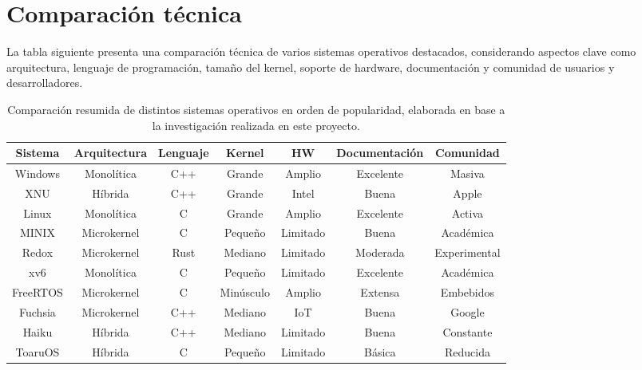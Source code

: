 \chapter{Comparación técnica}

La tabla siguiente presenta una comparación técnica de varios sistemas operativos destacados, considerando aspectos clave como arquitectura, lenguaje de programación, tamaño del kernel, soporte de hardware, documentación y comunidad de usuarios y desarrolladores.

\begin{sidewaystable}[p]
\centering
\caption{Comparación resumida de distintos sistemas operativos en orden de popularidad, elaborada en base a la investigación realizada en este proyecto.}
\vspace{0.5cm} 
\begin{tabular}{|c|c|c|c|c|c|c|}
    \hline
    \textbf{Sistema} & \textbf{Arquitectura} & \textbf{Lenguaje} & \textbf{Kernel} & \textbf{HW} & \textbf{Documentación} & \textbf{Comunidad} \\ 
    \hline
    Windows & Monolítica & C++ & Grande & Amplio & Excelente & Masiva \\ 
    \hline
    XNU & Híbrida & C++ & Grande & Intel & Buena & Apple \\ 
    \hline
    Linux & Monolítica & C & Grande & Amplio & Excelente & Activa \\ 
    \hline
    MINIX & Microkernel & C & Pequeño & Limitado & Buena & Académica \\ 
    \hline
    Redox & Microkernel & Rust & Mediano & Limitado & Moderada & Experimental \\ 
    \hline
    xv6 & Monolítica & C & Pequeño & Limitado & Excelente & Académica \\ 
    \hline
    FreeRTOS & Microkernel & C & Minúsculo & Amplio & Extensa & Embebidos \\ 
    \hline
    Fuchsia & Microkernel & C++ & Mediano & IoT & Buena & Google \\ 
    \hline
    Haiku & Híbrida & C++ & Mediano & Limitado & Buena & Constante \\ 
    \hline
    ToaruOS & Híbrida & C & Pequeño & Limitado & Básica & Reducida \\ 
    \hline
\end{tabular}
\label{tab:comparacion_so_custom_h}
\end{sidewaystable}
